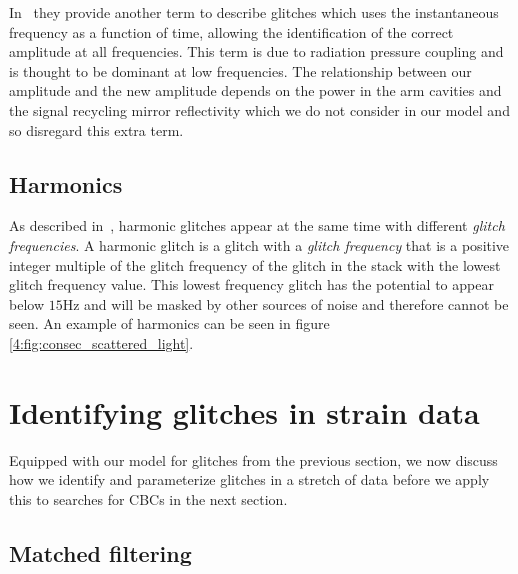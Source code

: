 In~\cite{Was_Subtract:2021} they provide another term to describe \scl{} glitches which uses the instantaneous frequency as a function of time, allowing the identification of the correct amplitude at all frequencies. This term is due to radiation pressure coupling and is thought to be dominant at low frequencies. The relationship between our amplitude and the new amplitude depends on the power in the arm cavities and the signal recycling mirror reflectivity which we do not consider in our model and so disregard this extra term.

\subsection{Harmonics}

As described in~\cite{TAccadia:2010}, harmonic glitches appear at the same time with different \emph{glitch frequencies}. A harmonic glitch is a glitch with a \emph{glitch frequency} that is a positive integer multiple of the glitch frequency of the glitch in the stack with the lowest glitch frequency value. This lowest frequency glitch has the potential to appear below $15$Hz and will be masked by other sources of noise and therefore cannot be seen. An example of harmonics can be seen in figure \ref{4:fig:consec_scattered_light}.

\section{\label{4:sec:search_techniques}Identifying \scl{} glitches in \gw{} strain data}

Equipped with our model for \scl{} glitches from the previous section, we now discuss how we identify and parameterize \scl{} glitches in a stretch of \gw{} data before we apply this to searches for CBCs in the next section. 

\subsection{\label{4:subsec:MF}Matched filtering}


